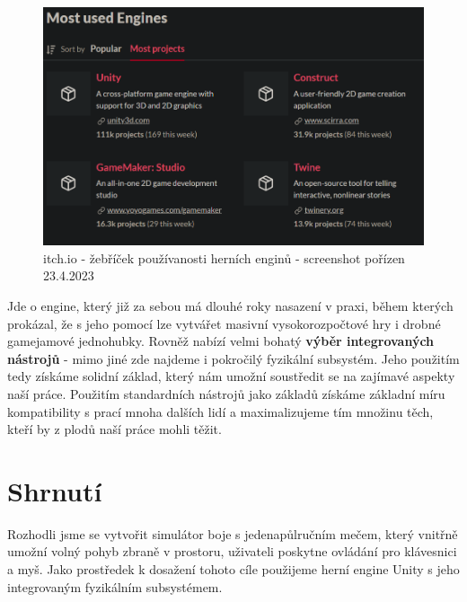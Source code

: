 \begin{figure}[h]\centering
    \center
    \includegraphics[width=140mm]{../img/Itch-mostUsedEngines.png}
    \caption{itch.io - žebříček používanosti herních enginů - screenshot pořízen 23.4.2023}
    \label{obr02:itchIoEngines}
    
\end{figure}

Jde o engine, který již za sebou má dlouhé roky nasazení v praxi, během kterých prokázal, že s jeho pomocí lze vytvářet masivní vysokorozpočtové hry i drobné gamejamové jednohubky. Rovněž nabízí velmi bohatý \textbf{výběr integrovaných nástrojů} - mimo jiné zde najdeme i pokročilý fyzikální subsystém. Jeho použitím tedy získáme solidní základ, který nám umožní soustředit se na zajímavé aspekty naší práce. Použitím standardních nástrojů jako základů získáme základní míru kompatibility s prací mnoha dalších lidí a maximalizujeme tím množinu těch, kteří by z plodů naší práce mohli těžit.

\section{Shrnutí}
Rozhodli jsme se vytvořit simulátor boje s jedenapůlručním mečem, který vnitřně umožní volný pohyb zbraně v prostoru, uživateli poskytne ovládání pro klávesnici a myš. Jako prostředek k dosažení tohoto cíle použijeme herní engine Unity \cite{Unity} s jeho integrovaným fyzikálním subsystémem. 

